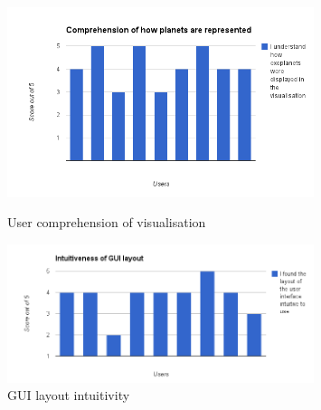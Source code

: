 \begin{figure}[H]
  \centering
      \includegraphics[width=0.8\textwidth]{images/charts/chart_4.png}
  \caption{User comprehension of visualisation}  
    \label{fig:chart4}
      \includegraphics[width=0.8\textwidth]{images/charts/chart_5.png}
  \caption{GUI layout intuitivity}  
    \label{fig:chart5}
\end{figure}


